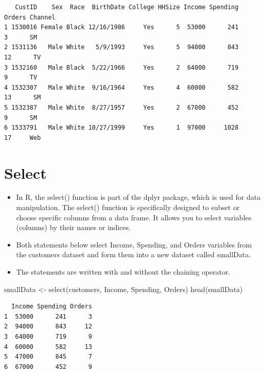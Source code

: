\documentclass[
  letterpaper,
  DIV=11,
  numbers=noendperiod]{scrreprt}
\newenvironment{Shaded}{\begin{snugshade}}{\end{snugshade}}
\newcommand{\FunctionTok}[1]{\textcolor[rgb]{0.28,0.35,0.67}{#1}}
\newcommand{\NormalTok}[1]{\textcolor[rgb]{0.00,0.23,0.31}{#1}}
\newcommand{\OtherTok}[1]{\textcolor[rgb]{0.00,0.23,0.31}{#1}}
\providecommand{\tightlist}{%
  \setlength{\itemsep}{0pt}\setlength{\parskip}{0pt}}\usepackage{longtable,booktabs,array}
\begin{document}
\begin{verbatim}
   CustID    Sex  Race  BirthDate College HHSize Income Spending Orders Channel
1 1530016 Female Black 12/16/1986     Yes      5  53000      241      3      SM
2 1531136   Male White   5/9/1993     Yes      5  94000      843     12      TV
3 1532160   Male Black  5/22/1966     Yes      2  64000      719      9      TV
4 1532307   Male White  9/16/1964     Yes      4  60000      582     13      SM
5 1532387   Male White  8/27/1957     Yes      2  67000      452      9      SM
6 1533791   Male White 10/27/1999     Yes      1  97000     1028     17     Web
\end{verbatim}


\chapter{Select}\label{select}

\begin{itemize}
\tightlist
\item
  In R, the select() function is part of the dplyr package, which is
  used for data manipulation. The select() function is specifically
  designed to subset or choose specific columns from a data frame. It
  allows you to select variables (columns) by their names or indices.
\item
  Both statements below select Income, Spending, and Orders variables
  from the customers dataset and form them into a new dataset called
  smallData.
\item
  The statements are written with and without the chaining operator.
\end{itemize}

\begin{Shaded}
\begin{Highlighting}[]
\NormalTok{smallData }\OtherTok{\textless{}{-}} \FunctionTok{select}\NormalTok{(customers, Income, Spending, Orders)}
\FunctionTok{head}\NormalTok{(smallData)}
\end{Highlighting}
\end{Shaded}

\begin{verbatim}
  Income Spending Orders
1  53000      241      3
2  94000      843     12
3  64000      719      9
4  60000      582     13
5  47000      845      7
6  67000      452      9
\end{verbatim}

\end{document}
